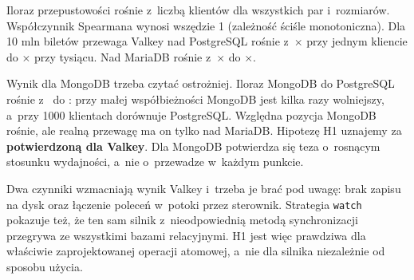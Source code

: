 Iloraz przepustowości rośnie z~liczbą klientów dla wszystkich par i~rozmiarów.
Współczynnik Spearmana wynosi wszędzie 1 (zależność ściśle monotoniczna). Dla
10 mln biletów przewaga Valkey nad PostgreSQL rośnie
z~$\times$ przy jednym kliencie
do $\times$ przy tysiącu.
Nad MariaDB rośnie z~$\times$
do $\times$.

Wynik dla MongoDB trzeba czytać ostrożniej. Iloraz MongoDB do PostgreSQL rośnie
z~ do
: przy małej
współbieżności MongoDB jest kilka razy wolniejszy, a~przy 1000 klientach
dorównuje PostgreSQL. Względna pozycja MongoDB rośnie, ale realną przewagę
ma on tylko nad MariaDB. Hipotezę H1 uznajemy za
\textbf{potwierdzoną dla Valkey}. Dla MongoDB potwierdza się teza
o~rosnącym stosunku wydajności, a~nie o~przewadze w~każdym punkcie.

Dwa czynniki wzmacniają wynik Valkey i~trzeba je brać pod uwagę: brak zapisu
na dysk oraz łączenie poleceń w~potoki przez sterownik. Strategia \texttt{watch}
pokazuje też, że ten sam silnik z~nieodpowiednią metodą synchronizacji
przegrywa ze wszystkimi bazami relacyjnymi. H1 jest więc prawdziwa dla
właściwie zaprojektowanej operacji atomowej, a~nie dla silnika
niezależnie od sposobu użycia.
